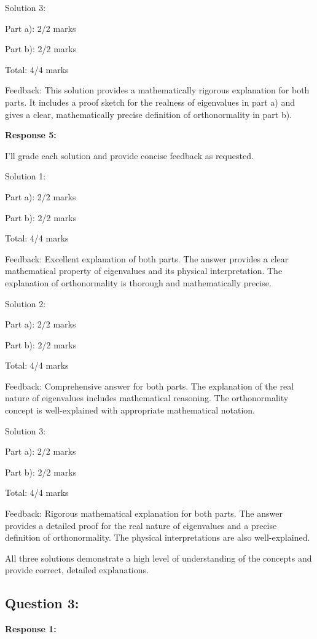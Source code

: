 \documentclass[a4paper,11pt]{article}
\begin{document}
Solution 3:

Part a): 2/2 marks

Part b): 2/2 marks

Total: 4/4 marks

Feedback: This solution provides a mathematically rigorous explanation for both parts. It includes a proof sketch for the realness of eigenvalues in part a) and gives a clear, mathematically precise definition of orthonormality in part b).

\bigskip   
\textbf{Response 5:}

I'll grade each solution and provide concise feedback as requested.

Solution 1:

Part a): 2/2 marks

Part b): 2/2 marks

Total: 4/4 marks

Feedback: Excellent explanation of both parts. The answer provides a clear mathematical property of eigenvalues and its physical interpretation. The explanation of orthonormality is thorough and mathematically precise.

Solution 2:

Part a): 2/2 marks

Part b): 2/2 marks

Total: 4/4 marks

Feedback: Comprehensive answer for both parts. The explanation of the real nature of eigenvalues includes mathematical reasoning. The orthonormality concept is well-explained with appropriate mathematical notation.

Solution 3:

Part a): 2/2 marks

Part b): 2/2 marks

Total: 4/4 marks

Feedback: Rigorous mathematical explanation for both parts. The answer provides a detailed proof for the real nature of eigenvalues and a precise definition of orthonormality. The physical interpretations are also well-explained.

All three solutions demonstrate a high level of understanding of the concepts and provide correct, detailed explanations.


\subsection*{Question 3:}

\textbf{Response 1:}
\end{document}
